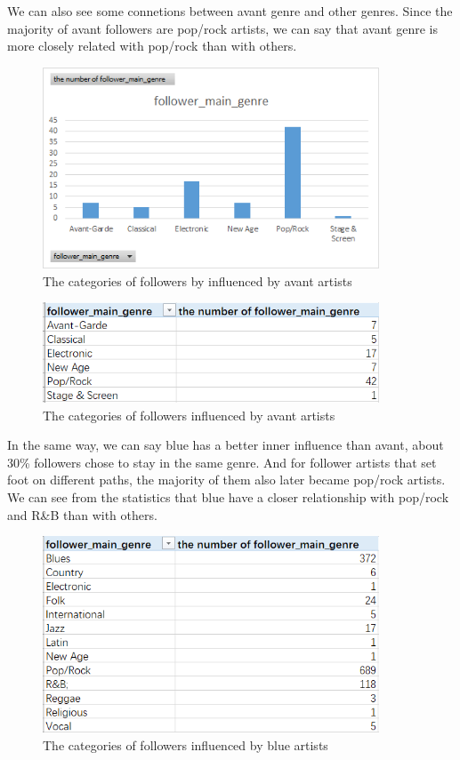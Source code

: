 \documentclass[12pt]{article}
\begin{document}
We can also see some connetions between avant genre and other genres. Since the majority of avant followers are pop/rock artists, we can say that avant genre is more closely related with pop/rock than with others.
\begin{figure}[h]
\centering
\includegraphics[width=10cm]{avant1.png}
\caption{The categories of followers by influenced by avant artists}
\end{figure}

\begin{figure}[h]
\centering
\includegraphics[width=10cm]{avant2.png}
\caption{The categories of followers influenced by avant artists}
\end{figure}

In the same way, we can say blue has a better inner influence than avant, about 30\% followers chose to stay in the same genre. And for follower artists that set foot on different paths, the majority of them also later became pop/rock artists. We can see from the statistics that blue have a closer relationship with pop/rock and R\&B than with others.
\begin{figure}[h]
\centering
\includegraphics[width=10cm]{blue.png}
\caption{The categories of followers influenced by blue artists}
\end{figure}
\end{document}
